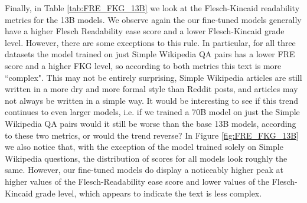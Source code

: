 \documentclass[11pt, oneside]{article}   	%
\begin{document}
Finally, in Table \ref{tab:FRE_FKG_13B} we look at the Flesch-Kincaid readability metrics for the 13B models. 
We observe again the our fine-tuned models generally have a higher Flesch Readability ease score and a lower Flesch-Kincaid grade level.
However, there are some exceptions to this rule.
In particular, for all three datasets the model trained on just Simple Wikipedia QA pairs has a lower FRE score and a higher FKG level, so according to both metrics this text is more ``complex".
This may not be entirely surprising, Simple Wikipedia articles are still written in a more dry and more formal style than Reddit posts, and articles may not always be written in a simple way. 
It would be interesting to see if this trend continues to even larger models, i.e. if we trained a 70B model on just the Simple Wikipedia QA pairs would it still be worse than the base 13B models, according to these two metrics, or would the trend reverse?
In Figure \ref{fig:FRE_FKG_13B} we also notice that, with the exception of the model trained solely on Simple Wikipedia questions, the distribution of scores for all models look roughly the same.
However, our fine-tuned models do display a noticeably higher peak at higher values of the Flesch-Readability ease score and lower values of the Flesch-Kincaid grade level, which appears to indicate the text is less complex.
\end{document}
